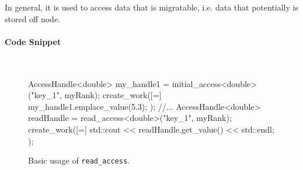 In general, it is used to access data that is migratable, i.e. data 
that potentially is stored off node.


\paragraph{Code Snippet}\mbox{}\\
\begin{figure}[!h]
\begin{CppCodeNumb}
AccessHandle<double> my_handle1 = initial_access<double>("key_1", myRank);
create_work([=]{
	my_handle1.emplace_value(5.3);
});
//...
AccessHandle<double> readHandle = read_access<double>("key_1", myRank);
create_work([=]{
	std::cout << readHandle.get_value() << std::endl;
});
\end{CppCodeNumb}
\label{fig:fe_api_readaccess}
\caption{Basic usage of \texttt{read\_access}.}
\end{figure}



